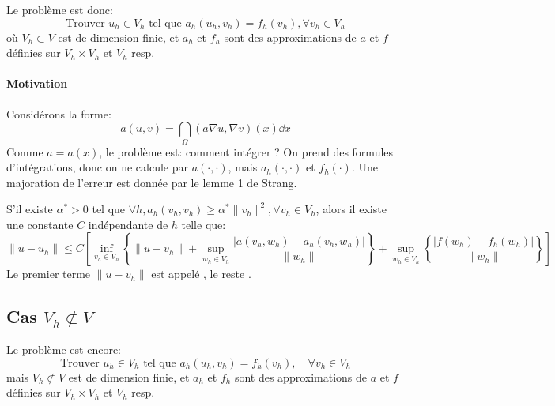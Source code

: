 Le problème est donc:
\begin{equation}
\text{Trouver } u_h\in V_h \text{ tel que } a_h(u_h,v_h) = f_h(v_h), \forall v_h\in V_h
\end{equation}
où $V_h\subset V$ est de dimension finie, et $a_h$ et $f_h$ sont des approximations
de $a$ et $f$ définies sur $V_h\times V_h$ et $V_h$ resp.
\medskip
{}
\medskip
\paragraph{Motivation}
Considérons la forme:
\begin{equation}a(u,v)=\dint_\Omega (a\nabla u,\nabla v)(x)\dd x\end{equation}
Comme $a=a(x)$, le problème est: comment intégrer ?
On prend des formules d'intégrations, donc on ne calcule par $a(\cdot,\cdot)$,
mais $a_h(\cdot,\cdot)$ et $f_h(\cdot)$.
\medskip
Une majoration de l'erreur est donnée par le lemme 1 de Strang.

\begin{lemme}
S'il existe $\alpha^*>0$ tel que $\forall h, a_h(v_h,v_h)\ge\alpha^*\|v_h\|^2, \forall v_h\in V_h$,
alors il existe une constante $C$ indépendante de $h$ telle que:
\begin{equation}
\|u-u_h\|\le C\left[
\inf_{v_h\in V_h} \left\{ \|u-v_h\| + \sup_{w_h\in V_h} \dfrac{|a(v_h,w_h)-a_h(v_h,w_h)|}{\|w_h\|}\right\}
+\sup_{w_h\in V_h}\left\{\dfrac{|f(w_h)-f_h(w_h)|}{\|w_h\|}\right\}
\right]
\end{equation}
Le premier terme $ \|u-v_h\|$ est appelé ,
le reste .
\end{lemme}

\medskip
\subsection{Cas $V_h\not\subset V$}
Le problème est encore:
\begin{equation}
\text{Trouver } u_h\in V_h \text{ tel que } a_h(u_h,v_h) = f_h(v_h),\quad \forall v_h\in V_h
\end{equation}
mais $V_h\not\subset V$ est de dimension finie, et $a_h$ et $f_h$ sont des approximations
de $a$ et $f$ définies sur $V_h\times V_h$ et $V_h$ resp.

